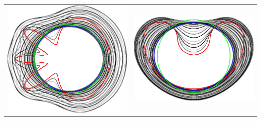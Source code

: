 \begin{frame}
\begin{tabular}{cc}
\includegraphics[scale=0.12]{figures/elastica-minimization/with-neighborhood-flow/radius_16/flower.png}\hspace{3em} &
\includegraphics[scale=0.12]{figures/elastica-minimization/with-neighborhood-flow/radius_16/bean.png}
\end{tabular}

\end{frame}

